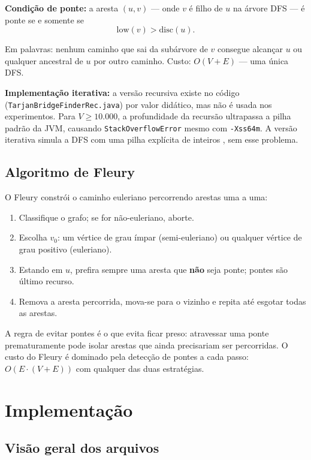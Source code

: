 \documentclass[12pt]{article}
\begin{document}
\textbf{Condição de ponte:} a aresta $(u,v)$ --- onde $v$ é filho de $u$
na árvore DFS --- é ponte se e somente se
\[
\mathrm{low}(v) > \mathrm{disc}(u).
\]

Em palavras: nenhum caminho que sai da subárvore de $v$ consegue alcançar
$u$ ou qualquer ancestral de $u$ por outro caminho. Custo: $O(V{+}E)$ ---
uma única DFS.

\textbf{Implementação iterativa:} a versão recursiva existe no código
(\texttt{TarjanBridgeFinderRec.java}) por valor didático, mas não é usada
nos experimentos. Para $V \geq 10.000$, a profundidade da recursão
ultrapassa a pilha padrão da JVM, causando \texttt{StackOverflowError}
mesmo com \texttt{-Xss64m}. A versão iterativa simula a DFS com uma pilha
explícita de inteiros \cite{so-tarjan,so-dfs}, sem esse problema.

\subsection{Algoritmo de Fleury}
\label{sec:fleury}

O Fleury constrói o caminho euleriano percorrendo arestas uma a uma:
\begin{enumerate}
    \item Classifique o grafo; se for não-euleriano, aborte.
    \item Escolha $v_0$: um vértice de grau ímpar (semi-euleriano) ou
          qualquer vértice de grau positivo (euleriano).
    \item Estando em $u$, prefira sempre uma aresta que \textbf{não} seja
          ponte; pontes são último recurso.
    \item Remova a aresta percorrida, mova-se para o vizinho e repita até
          esgotar todas as arestas.
\end{enumerate}

A regra de evitar pontes é o que evita ficar preso: atravessar uma ponte
prematuramente pode isolar arestas que ainda precisariam ser percorridas.
O custo do Fleury é dominado pela detecção de pontes a cada passo:
$O(E \cdot (V{+}E))$ com qualquer das duas estratégias.

\section{Implementação}

\subsection{Visão geral dos arquivos}
\end{document}
